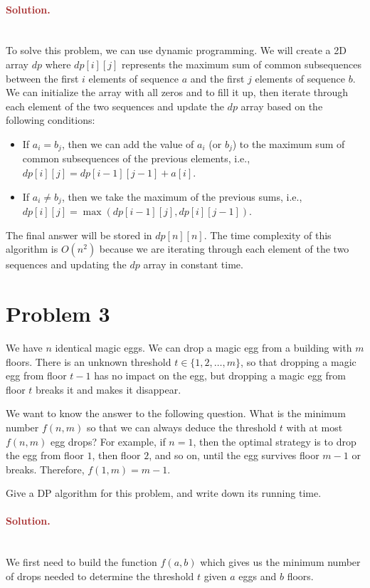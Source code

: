\paragraph{\textcolor{brown}{Solution.}} \: \\
To solve this problem, we can use dynamic programming. We will create a 2D array $dp$ where $dp[i][j]$ represents the maximum sum of common subsequences between the first $i$ elements of sequence $a$ and the first $j$ elements of sequence $b$. We can initialize the array with all zeros and to fill it up, then iterate through each element of the two sequences and update the $dp$ array based on the following conditions:
\begin{itemize}
    \item If $a_i = b_j$, then we can add the value of $a_i$ (or $b_j$) to the maximum sum of common subsequences of the previous elements, i.e., $dp[i][j] = dp[i-1][j-1] + a[i]$.
    \item If $a_i \neq b_j$, then we take the maximum of the previous sums, i.e., $dp[i][j] = \max(dp[i-1][j], dp[i][j-1])$.
\end{itemize}
The final answer will be stored in $dp[n][n]$.
The time complexity of this algorithm is $O(n^2)$ because we are iterating through each element of the two sequences and updating the $dp$ array in constant time.


\section*{Problem 3}
We have $n$ identical magic eggs. We can drop a magic egg from a building with $m$ floors. There is an unknown threshold $t \in \{1, 2, \ldots, m\}$, so that dropping a magic egg from floor $t - 1$ has no impact on the egg, but dropping a magic egg from floor $t$ breaks it and makes it disappear.

We want to know the answer to the following question. What is the minimum number $f(n, m)$ so that we can always deduce the threshold $t$ with at most $f(n, m)$ egg drops? For example, if $n = 1$, then the optimal strategy is to drop the egg from floor $1$, then floor $2$, and so on, until the egg survives floor $m - 1$ or breaks. Therefore, $f(1, m) = m - 1$.

Give a DP algorithm for this problem, and write down its running time.

\paragraph{\textcolor{brown}{Solution.}} \: \\
We first need to build the function $f(a, b)$ which gives us the minimum number of drops needed to determine the threshold $t$ given $a$ eggs and $b$ floors. 


